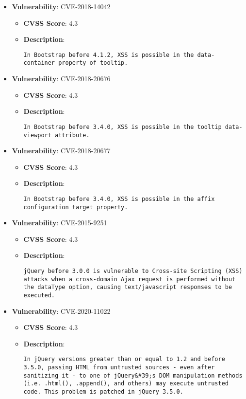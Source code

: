 \documentclass{article}
\begin{document}
\begin{itemize}
        \item \textbf{Vulnerability}: CVE-2018-14042
        \begin{itemize}
            \item \textbf{CVSS Score}:  4.3 
            \item \textbf{Description}:
            \parbox[t]{0.9\linewidth}{
                \verb|In Bootstrap before 4.1.2, XSS is possible in the data-container property of tooltip.|
            }
        \end{itemize}
    
        \item \textbf{Vulnerability}: CVE-2018-20676
        \begin{itemize}
            \item \textbf{CVSS Score}:  4.3 
            \item \textbf{Description}:
            \parbox[t]{0.9\linewidth}{
                \verb|In Bootstrap before 3.4.0, XSS is possible in the tooltip data-viewport attribute.|
            }
        \end{itemize}
    
        \item \textbf{Vulnerability}: CVE-2018-20677
        \begin{itemize}
            \item \textbf{CVSS Score}:  4.3 
            \item \textbf{Description}:
            \parbox[t]{0.9\linewidth}{
                \verb|In Bootstrap before 3.4.0, XSS is possible in the affix configuration target property.|
            }
        \end{itemize}
    
        \item \textbf{Vulnerability}: CVE-2015-9251
        \begin{itemize}
            \item \textbf{CVSS Score}:  4.3 
            \item \textbf{Description}:
            \parbox[t]{0.9\linewidth}{
                \verb|jQuery before 3.0.0 is vulnerable to Cross-site Scripting (XSS) attacks when a cross-domain Ajax request is performed without the dataType option, causing text/javascript responses to be executed.|
            }
        \end{itemize}
    
        \item \textbf{Vulnerability}: CVE-2020-11022
        \begin{itemize}
            \item \textbf{CVSS Score}:  4.3 
            \item \textbf{Description}:
            \parbox[t]{0.9\linewidth}{
                \verb|In jQuery versions greater than or equal to 1.2 and before 3.5.0, passing HTML from untrusted sources - even after sanitizing it - to one of jQuery&#39;s DOM manipulation methods (i.e. .html(), .append(), and others) may execute untrusted code. This problem is patched in jQuery 3.5.0.|
            }
        \end{itemize}
    

\end{itemize}
\end{document}

